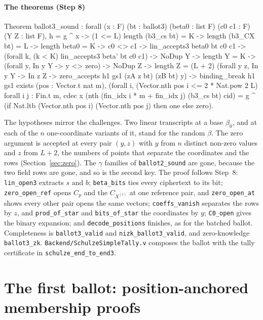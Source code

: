 \documentclass[11pt,a4paper]{article}
\newcommand{\rocq}[1]{\texttt{#1}}
\theoremstyle{remark}
\begin{document}
\paragraph{The theorems (Step 8)}
\begin{coq}
Theorem ballot3_sound : forall (x : F) (bt : ballot3) (beta0 : list F) (c0 c1 : F)
  (Y Z : list F),
  h = g ^ x -> (1 <= L)%
  length (b3_cs bt) = K -> length (b3_CX bt) = L -> length beta0 = K -> c0 <> c1 ->
  lin_accepts3 beta0 bt c0 c1 ->
  (forall k, (k < K)%
     lin_accepts3 beta' bt c0 c1) ->
  NoDup Y -> length Y = K -> (forall y, In y Y -> y <> zero) ->
  NoDup Z -> length Z = (L + 2)%
  (forall y z, In y Y -> In z Z -> zero_accepts h1 gs1 (zA z bt) (zB bt) y) ->
  binding_break h1 gs1 \/
  exists (pos : Vector.t nat m),
    (forall i, (Vector.nth pos i <= 2 * Nat.pow 2 L)%
    forall i j : Fin.t m,
      cdec x (nth (fin_idx i * m + fin_idx j) (b3_cs bt) cid) =
      g ^ (if Nat.ltb (Vector.nth pos i) (Vector.nth pos j) then one else zero).
\end{coq}
The hypotheses mirror the challenges. Two linear transcripts at a base
$\beta_0$, and at each of the $n$ one-coordinate variants of it, stand
for the random $\beta$. The zero argument is accepted at every pair $(y,
z)$ with $y$ from $n$ distinct non-zero values and $z$ from $L + 2$, the
numbers of points that separate the coordinates and the rows
(Section~\ref{sec:zero}). The $\gamma$ families of \rocq{ballot2\_sound}
are gone, because the two field rows are gone, and so is the second key.
The proof follows Step~8: \rocq{lin\_open3} extracts $s$ and $b$;
\rocq{beta\_bits} ties every ciphertext to its bit; \rocq{zero\_open\_ref}
opens $C_p$ and the $C_{X^{(t)}}$ at one reference pair, and
\rocq{zero\_open\_at} shows every other pair opens the same vectors;
\rocq{coeffs\_vanish} separates the rows by $z$, and \rocq{prod\_of\_star}
and \rocq{bits\_of\_star} the coordinates by $y$; \rocq{C0\_open} gives the
binary expansion; and \rocq{decode\_positions} finishes, as for the batched
ballot. Completeness is \rocq{ballot3\_valid} and
\rocq{nizk\_ballot3\_valid}, and zero-knowledge \rocq{ballot3\_zk}.
\rocq{Backend/SchulzeSimpleTally.v} composes the ballot with the tally
certificate in \rocq{schulze\_end\_to\_end3}.

\section{The first ballot: position-anchored membership proofs}\label{sec:ballot1}
\end{document}
